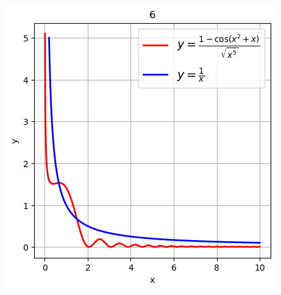 \documentclass{article}
\begin{document}
\\
\includegraphics[width=0.8\linewidth]{graphic6.png}
\end{document}
